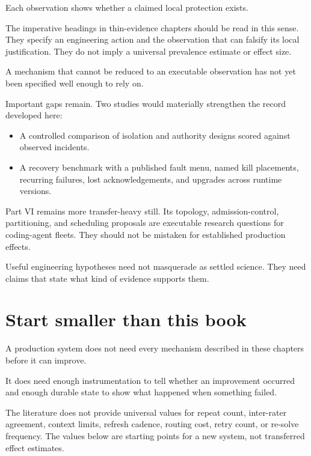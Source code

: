 Each observation shows whether a claimed local protection exists.

The imperative headings in thin-evidence chapters should be read in this sense. They specify an engineering action and the observation that can falsify its local justification. They do not imply a universal prevalence estimate or effect size.

A mechanism that cannot be reduced to an executable observation has not yet been specified well enough to rely on.

Important gaps remain. Two studies would materially strengthen the record developed here:

\begin{itemize}
\tightlist
\item
  A controlled comparison of isolation and authority designs scored against observed incidents.
\item
  A recovery benchmark with a published fault menu, named kill placements, recurring failures, lost acknowledgements, and upgrades across runtime versions.
\end{itemize}

Part VI remains more transfer-heavy still. Its topology, admission-control, partitioning, and scheduling proposals are executable research questions for coding-agent fleets. They should not be mistaken for established production effects.

Useful engineering hypotheses need not masquerade as settled science. They need claims that state what kind of evidence supports them.

\hypertarget{start-smaller-than-this-book}{%
\section{Start smaller than this book}\label{start-smaller-than-this-book}}

A production system does not need every mechanism described in these chapters before it can improve.

It does need enough instrumentation to tell whether an improvement occurred and enough durable state to show what happened when something failed.

The literature does not provide universal values for repeat count, inter-rater agreement, context limits, refresh cadence, routing cost, retry count, or re-solve frequency. The values below are starting points for a new system, not transferred effect estimates.

